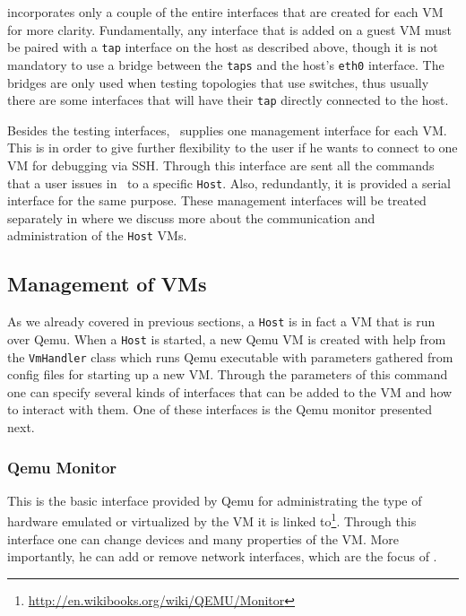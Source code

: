  incorporates only a couple of the entire interfaces that are created for each VM for more clarity.
Fundamentally, any interface that is added on a guest VM must be paired with a \texttt{tap} interface on the host as described above, though it is not mandatory to use a bridge between the \texttt{taps} and the host's \texttt{eth0} interface.
The bridges are only used when testing topologies that use switches, thus usually there are some interfaces that will have their \texttt{tap} directly connected to the host.

Besides the testing interfaces, \project\ supplies one management interface for each VM.
This is in order to give further flexibility to the user if he wants to connect to one VM for debugging via SSH.
Through this interface are sent all the commands that a user issues in \project\ to a specific \texttt{Host}.
Also, redundantly, it is provided a serial interface for the same purpose.
These management interfaces will be treated separately in  where we discuss more about the communication and administration of the \texttt{Host} VMs.

\subsection{Management of VMs}
\label{sub-sec:communication-with-vm}

As we already covered in previous sections, a \texttt{Host} is in fact a VM that is run over Qemu.
When a \texttt{Host} is started, a new Qemu VM is created with help from the \texttt{VmHandler} class which runs Qemu executable with parameters gathered from config
files for starting up a new VM.
Through the parameters of this command one can specify several kinds of interfaces that can be added to the VM and how to interact with them.
One of these interfaces is the Qemu monitor presented next.

\subsubsection{Qemu Monitor}
\label{sub-sub-sec:qemu-monitor}

This is the basic interface provided by Qemu for administrating the type of hardware emulated or virtualized by the VM it is linked to\footnote{\url{http://en.wikibooks.org/wiki/QEMU/Monitor}}.
Through this interface one can change devices and many properties of the VM.
More importantly, he can add or remove network interfaces, which are the focus of \project.

